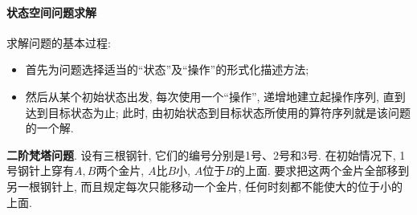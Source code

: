 \paragraph{状态空间问题求解}
求解问题的基本过程:
\begin{itemize}
\item 首先为问题选择适当的“状态”及“操作”的形式化描述方法;
\item 然后从某个初始状态出发, 每次使用一个“操作”, 递增地建立起操作序列, 直到达到目标状态为止; 此时, 由初始状态到目标状态所使用的算符序列就是该问题的一个解.
\end{itemize}
\begin{example}
  \textbf{二阶梵塔问题}. 设有三根钢针, 它们的编号分别是1号、2号和3号. 在初始情况下, 1号钢针上穿有$A,B$两个金片, $A$比$B$小, $A$位于$B$的上面. 要求把这两个金片全部移到另一根钢针上, 而且规定每次只能移动一个金片, 任何时刻都不能使大的位于小的上面.
\end{example}
